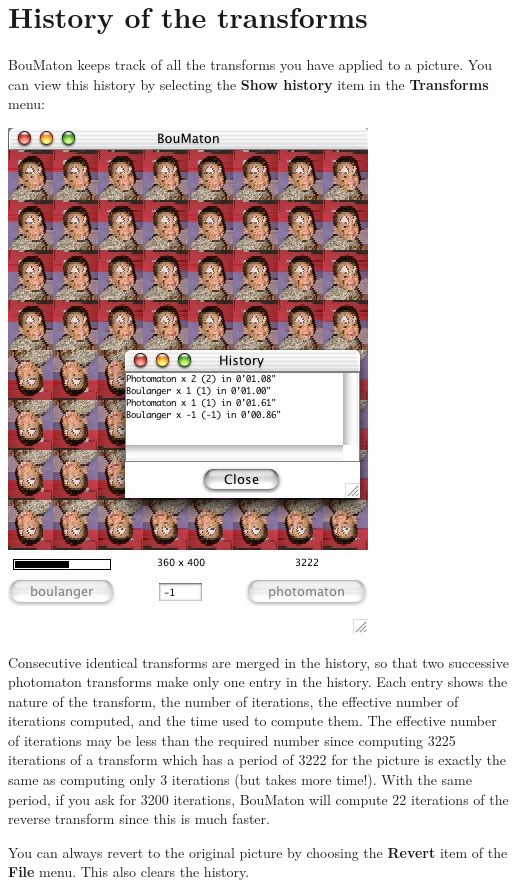 \documentclass[a4paper]{article}
\newcommand{\BouMaton}{\textsf{BouMaton}\xspace}
\newcommand{\menu}[1]{\textsf{\textbf{#1}}}
\begin{document}
  \section{History of the transforms}
  \BouMaton keeps track of all the transforms you have applied to a 
  picture. You can view this history by selecting the \menu{Show history} 
  item in the \menu{Transforms} menu:
  \begin{center}
    \includegraphics[scale=0.4]{history}
  \end{center}
  Consecutive identical transforms are merged in the history, so that 
  two successive photomaton transforms make only one entry in the 
  history. Each entry shows the nature of the transform, the number of 
  iterations, the effective number of iterations computed, and the 
  time used to compute them. The effective number of iterations may be 
  less than the required number since computing 3225 iterations of a 
  transform which has a period of 3222 for the picture is exactly the 
  same as computing only 3 iterations (but takes more time!). With the 
  same period, if you ask for 3200 iterations, \BouMaton will compute 
  22 iterations of the reverse transform since this is much faster.
  
  You can always revert to the original picture by choosing the 
  \menu{Revert} item of the \menu{File} menu. This also clears the history.
  
\end{document}
